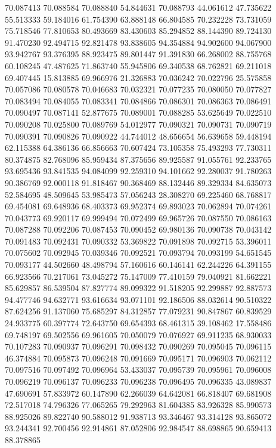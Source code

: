 70.087413
70.088584
70.088840
54.844631
70.088793
44.061612
47.735622
55.513333
59.184016
61.754390
63.888148
66.804585
70.232228
73.731059
75.718546
77.810653
80.493669
83.430603
85.294852
88.144390
89.724130
91.470230
92.494715
92.821478
93.838605
94.354884
94.902600
94.067900
93.942767
93.376395
88.923475
89.801447
91.391830
66.268002
88.755768
60.108245
47.487625
71.863740
55.945806
69.340538
68.762821
69.211018
69.407445
15.813885
69.966976
21.326883
70.036242
70.022796
25.575858
70.057086
70.080578
70.046683
70.032321
70.077235
70.080050
70.077827
70.083494
70.084055
70.083341
70.084866
70.086301
70.086363
70.086491
70.090497
70.087141
52.877675
70.089001
70.088285
53.625649
70.022510
70.090208
70.025800
70.089769
54.012977
70.090321
70.090731
70.090719
70.090391
70.090826
70.090922
44.744012
48.656654
56.639658
59.448194
62.115388
64.386136
66.856663
70.607424
73.105358
75.493293
77.730311
80.374875
82.768096
85.959434
87.375656
89.925587
91.055761
92.233765
93.695436
93.841535
94.084099
92.259310
94.101662
92.280037
91.780263
90.386769
92.000118
91.818467
90.368469
88.132446
89.329334
84.635073
52.584695
48.509645
53.985473
57.056243
28.308270
69.225460
68.768817
69.454081
69.648936
68.403373
69.952374
69.893023
70.062894
70.074261
70.043773
69.920117
69.999494
70.072499
69.965726
70.087550
70.086163
70.087288
70.092206
70.087453
70.090452
69.980136
70.090738
70.043142
70.091483
70.092431
70.090332
53.369822
70.091898
70.092715
53.396011
70.075602
70.092945
70.039346
70.092521
70.093794
70.093199
54.651545
70.093177
44.502660
48.498794
57.160616
60.146141
62.244226
64.391155
66.923566
70.217061
73.045272
75.147009
77.410159
79.040921
81.662221
85.629857
86.539504
87.827774
89.099322
91.518205
92.299887
92.887573
94.477746
94.632771
93.616634
93.071101
92.186506
88.032614
90.510322
87.624256
91.137060
75.685297
84.312857
77.079231
90.847867
60.839529
24.933775
60.397774
72.643750
69.654393
68.461315
39.108462
17.558486
69.748197
69.502556
69.961605
70.050079
70.076927
69.911235
68.930033
70.107283
70.090937
70.096291
70.098432
70.090269
70.095045
70.096115
46.374884
70.095873
70.096248
70.091669
70.095171
70.096903
70.062112
70.097516
70.097492
70.096964
53.433037
70.095739
70.095961
70.096008
70.096219
70.096137
70.096233
70.096238
70.096495
70.096335
43.089837
47.690691
57.833972
60.147890
62.266039
64.642081
66.818407
69.681908
72.517018
74.796326
77.065265
79.292963
81.604385
83.926328
85.990573
88.925026
89.822740
90.588012
91.938713
93.346467
93.314128
93.865072
93.244341
92.700456
92.914861
87.052806
92.984547
88.698865
90.659413
88.378865
